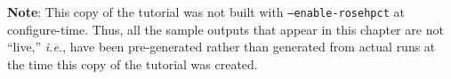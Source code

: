 \textbf{Note}: This copy of the tutorial was not built with
\texttt{--enable-rosehpct} at configure-time. Thus, all the sample outputs
that appear in this chapter are not ``live,'' \emph{i.e.}, have been
pre-generated rather than generated from actual runs at the time this
copy of the tutorial was created.
